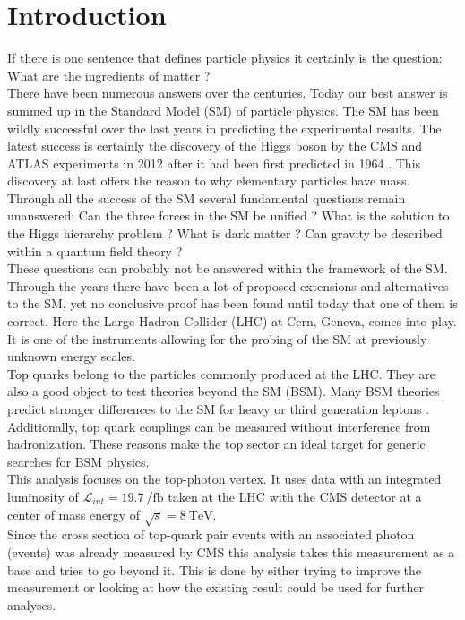 \chapter{Introduction}

If there is one sentence that defines particle physics it certainly is the question: What are the ingredients of matter ? \\
There have been numerous answers over the centuries. Today our best answer is summed up in the Standard Model (SM) of particle physics. The SM has been wildly successful over the last years in predicting the experimental results. The latest success is certainly the discovery of the Higgs boson by the CMS and ATLAS experiments in 2012 \cite{Aad:2012tfa} \cite{Chatrchyan:2012ufa} after it had been first predicted in 1964 \cite{Englert:1964et} \cite{Higgs:1964ia}. This discovery at last offers the reason to why elementary particles have mass. \\
Through all the success of the SM several fundamental questions remain unanswered: Can the three forces in the SM be unified ? What is the solution to the Higgs hierarchy problem ? What is dark matter ? Can gravity be described within a quantum field theory ? \\
These questions can probably not be answered within the framework of the SM. Through the years there have been a lot of proposed extensions and alternatives to the SM, yet no conclusive proof has been found until today that one of them is correct. Here the Large Hadron Collider (LHC) at Cern, Geneva, comes into play. It is one of the instruments allowing for the probing of the SM at previously unknown energy scales. \\
Top quarks belong to the particles commonly produced at the LHC. They are also a good object to test theories beyond the SM (BSM). Many BSM theories predict stronger differences to the SM for heavy or third generation leptons \cite{AguilarSaavedra:2008zc}. Additionally, top quark couplings can be measured without interference from hadronization. These reasons make the top sector an ideal target for generic searches for BSM physics. \\
This analysis focuses on the top-photon vertex. It uses data with an integrated luminosity of $\mathcal{L}_{int} = \SI{19.7}{\per \femto \barn}$ taken at the LHC with the CMS detector at a center of mass energy of $\sqrt{s} = \SI{8}{\tera \electronvolt}$. \\
Since the cross section of top-quark pair events with an associated photon (\ttgamma events) was already measured by CMS \cite{CMS-PAS-TOP-13-011} this analysis takes this measurement as a base and tries to go beyond it. This is done by either trying to improve the measurement or looking at how the existing result could be used for further analyses. \\
